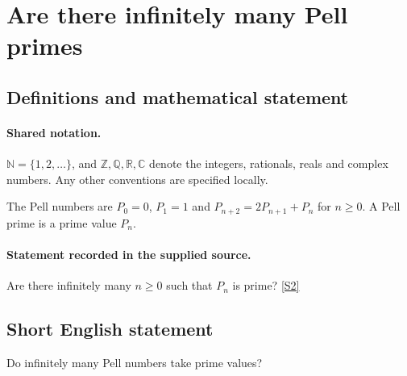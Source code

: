 \documentclass[11pt]{article}
\newcommand{\sref}[2]{\hyperlink{source:#1:#2}{[S#2]}}
\begin{document}
\section{Are there infinitely many Pell primes}\label{statement}

\subsection{Definitions and mathematical statement}

\paragraph{Shared notation.}$\mathbb N=\{1,2,\ldots\}$, and $\mathbb Z,\mathbb Q,\mathbb R,\mathbb C$ denote the integers, rationals, reals and complex numbers. Any other conventions are specified locally.


The Pell numbers are $P_0=0$, $P_1=1$ and $P_{n+2}=2P_{n+1}+P_n$ for $n\ge0$. A Pell prime is a prime value $P_n$.
\paragraph{Statement recorded in the supplied source.}
Are there infinitely many $n\ge0$ such that $P_n$ is prime? \sref{statement}{2}
\subsection{Short English statement}
Do infinitely many Pell numbers take prime values?
\end{document}
